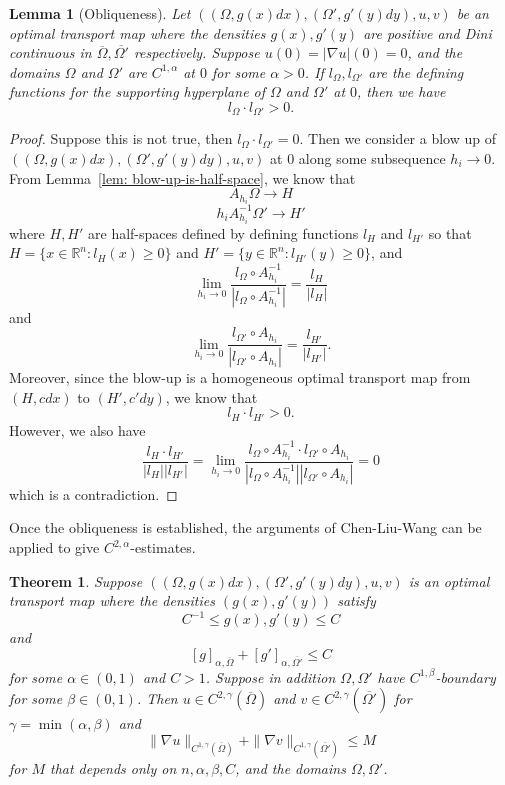 \documentclass[12pt,reqno]{amsart}
\newtheorem{lem}{Lemma}[section]
\newtheorem{theorem}{Theorem}[section]
\numberwithin{equation}{section}
\begin{document}
    \begin{lem}[Obliqueness]\label{lem: obliqueness}
        Let $((\Omega, g(x)dx), (\Omega', g'(y)dy), u, v)$ be an optimal transport map where the densities $g(x), g'(y)$ are positive and Dini continuous in $\overline\Omega, \overline{\Omega'}$ respectively. Suppose $u(0) = |\nabla u|(0) = 0$, and the domains $\Omega$ and $\Omega'$ are $C^{1, \alpha}$ at $0$ for some $\alpha>0$. If $l_{\Omega}, l_{\Omega'}$ are the defining functions for the supporting hyperplane of $\Omega$ and $\Omega'$ at $0$, then we have
        \[l_{\Omega}\cdot l_{\Omega'}>0.\]
    \end{lem}
    \begin{proof}
        Suppose this is not true, then $l_{\Omega}\cdot l_{\Omega'} = 0$. Then we consider a blow up of \\$((\Omega, g(x)dx), (\Omega', g'(y)dy), u, v)$ at $0$ along some subsequence $h_i\to 0$. From Lemma~\ref{lem: blow-up-is-half-space}, we know that
        \[A_{h_i}\Omega\to H\]
        \[h_iA_{h_i}^{-1}\Omega'\to H'\]
        where $H, H'$ are half-spaces defined by defining functions $l_H$ and $l_{H'}$ so that $H = \{x\in \mathbb R^n: l_H(x)\geq 0\}$ and $H' = \{y\in \mathbb R^n: l_{H'}(y)\geq 0\}$, and 
        \[\lim_{h_i\to 0}\frac{l_{\Omega}\circ{A_{h_i}^{-1}}}{|l_{\Omega}\circ{A_{h_i}^{-1}}|}= \frac{l_H}{|l_H|}\]
        and
        \[\lim_{h_i\to 0}\frac{l_{\Omega'}\circ A_{h_i}}{|l_{\Omega'}\circ A_{h_i}|}= \frac{l_{H'}}{|l_{H'}|}.\]
        Moreover, since the blow-up is a homogeneous optimal transport map from $(H, cdx)$ to $(H', c'dy)$, we know that
        \[l_H\cdot l_{H'}>0.\]
        However, we also have 
        \[\frac{l_H\cdot l_{H'}}{|l_H||l_{H'}|} = \lim_{h_i\to 0}\frac{l_{\Omega}\circ{A_{h_i}^{-1}}\cdot l_{\Omega'}\circ A_{h_i}}{|l_{\Omega}\circ{A_{h_i}^{-1}}||l_{\Omega'}\circ A_{h_i}|} =0\]
        which is a contradiction. 
    \end{proof}

    Once the obliqueness is established, the arguments of Chen-Liu-Wang \cite[Section 6]{Chen-Liu-Wang} can be applied to give $C^{2, \alpha}$-estimates. 
    \begin{theorem}\label{thm: global-C-2-a-regularity}
        Suppose $((\Omega, g(x)dx), (\Omega', g'(y)dy), u, v)$ is an optimal transport map where the densities $(g(x), g'(y))$ satisfy
	    \[C^{-1}\leq g(x), g'(y)\leq C\]
    	   and
	    \[[g]_{\alpha, \overline{\Omega}}+[g']_{\alpha, \overline{\Omega'}}\leq C\]
            for some $\alpha\in (0, 1)$ and $C>1$.
            Suppose in addition $\Omega, \Omega'$ have $C^{1, \beta}$-boundary for some $\beta\in(0, 1)$. Then $u\in C^{2, \gamma}(\overline\Omega)$ and $v\in C^{2, \gamma}(\overline{\Omega'})$ for $\gamma = \min(\alpha, \beta)$ and
        \[\|\nabla u\|_{C^{1, \gamma}(\overline{\Omega})}+\|\nabla v\|_{C^{1, \gamma}(\overline{\Omega'})}\leq M\]
        for $M$ that depends only on $n, \alpha, \beta, C$, and the domains $\Omega, \Omega'$. 
    \end{theorem}
\end{document}

